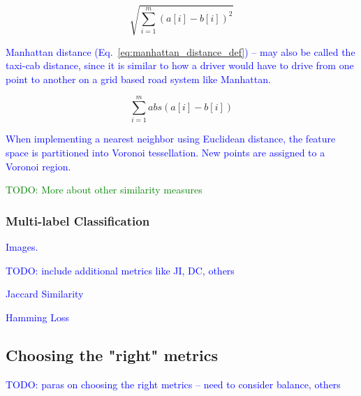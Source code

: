 \begin{equation}
{\sqrt{\sum_{i=1}^{m}{{(a[i] - b[i])}^2}}}
\label{eq:euclidean_distance_def}
\end{equation}


\textcolor{blue}{Manhattan distance (Eq.~\ref{eq:manhattan_distance_def}) -- may also be called the taxi-cab distance, since it is similar to how a driver would have to drive from one point to another on a grid based road system like Manhattan.}

\begin{equation}
{\sum_{i=1}^{m}{abs(a[i] - b[i])}}
\label{eq:manhattan_distance_def}
\end{equation}

\textcolor{blue}{When implementing a nearest neighbor using Euclidean distance, the feature space is partitioned into {Voronoi tessellation}. New points are assigned to a {Voronoi region}.}

\textcolor{green}{TODO: More about other similarity measures}




\subsubsection{Multi-label Classification}

\textcolor{blue}{Images.}

\textcolor{blue}{TODO: include additional metrics like JI, DC, others}

\textcolor{blue}{Jaccard Similarity}

\textcolor{blue}{Hamming Loss}





\subsection{Choosing the "right" metrics}

\textcolor{blue}{TODO: paras on choosing the right metrics -- need to consider balance, others}



